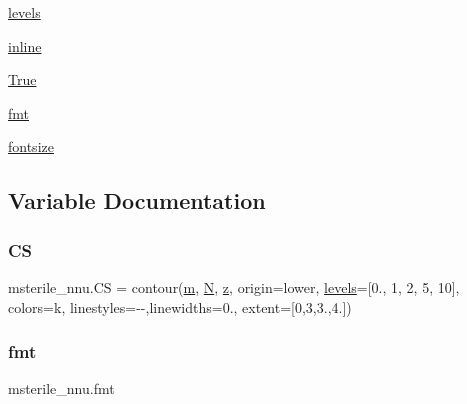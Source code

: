 \begin{DoxyCompactItemize}
$$\item 
\mbox{\hyperlink{namespacemsterile__nnu_a2313686e4fae8295172c1c4f1c520367}{levels}}
\item 
\mbox{\hyperlink{namespacemsterile__nnu_af01e59c38de6a134bcbb1f5778a8c386}{inline}}
\item 
\mbox{\hyperlink{namespacemsterile__nnu_ae8aa1b95c6db3173ecae7b21088fe7ff}{True}}
\item 
\mbox{\hyperlink{namespacemsterile__nnu_a76432739928c62d79024fe839a00c574}{fmt}}
\item 
\mbox{\hyperlink{namespacemsterile__nnu_abdda724975abeabe772e6a7437830729}{fontsize}}
\end{DoxyCompactItemize}


\subsection{Variable Documentation}
\mbox{\label{namespacemsterile__nnu_aa03517f00d798f1f63f542ce668e0bea}} 
\subsubsection{\texorpdfstring{CS}{CS}}
{\footnotesize\ttfamily msterile\+\_\+nnu.\+CS = contour(\mbox{\hyperlink{namespacemsterile__nnu_ad49be68bece85f98028b3cc37ad2bf49}{m}}, \mbox{\hyperlink{namespacemsterile__nnu_aa464b65176d2a7b327a61d2e1f1cf531}{N}}, \mbox{\hyperlink{namespacemsterile__nnu_a469ed5d6fc06710bc58b11f46a4639bd}{z}}, origin=\textquotesingle{}lower\textquotesingle{}, \mbox{\hyperlink{namespacemsterile__nnu_a2313686e4fae8295172c1c4f1c520367}{levels}}=\mbox{[}0., 1, 2, 5, 10\mbox{]}, colors=\textquotesingle{}k\textquotesingle{}, linestyles=\textquotesingle{}-\/-\/\textquotesingle{},linewidths=0., extent=\mbox{[}0,3,3.,4.\mbox{]})}

\mbox{\label{namespacemsterile__nnu_a76432739928c62d79024fe839a00c574}} 
\subsubsection{\texorpdfstring{fmt}{fmt}}
{\footnotesize\ttfamily msterile\+\_\+nnu.\+fmt}

